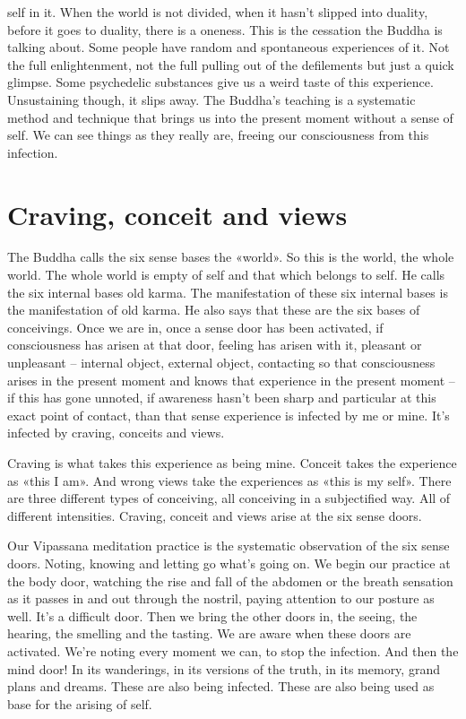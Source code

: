 \documentclass[letterpaper,10pt,english]{sphinxmanual}
\begin{document}
self in it. When the world is not divided, when it hasn’t slipped into duality,
before it goes to duality, there is a oneness.
This is the cessation the Buddha is talking about. Some people have random
and spontaneous experiences of it. Not the full enlightenment, not the full
pulling out of the defilements but just a quick glimpse. Some psychedelic
substances give us a weird taste of this experience. Unsustaining though, it
slips away. The Buddha’s teaching is a systematic method and technique that
brings us into the present moment without a sense of self. We can see things
as they really are, freeing our consciousness from this infection.


\section{Craving, conceit and views}
\label{\detokenize{5-b:craving-conceit-and-views}}
\sphinxAtStartPar
The Buddha calls the six sense bases the «world». So this is the world,
the whole world. The whole world is empty of self and that which belongs
to self. He calls the six internal bases old karma. The manifestation of these
six internal bases is the manifestation of old karma. He also says that these
are the six bases of conceivings. Once we are in, once a sense door has been
activated, if consciousness has arisen at that door, feeling has arisen with it,
pleasant or unpleasant – internal object, external object, contacting so that
consciousness arises in the present moment and knows that experience in the
present moment – if this has gone unnoted, if awareness hasn’t been sharp
and  particular  at  this  exact  point  of  contact,  than  that  sense  experience  is
infected by me or mine. It’s infected by craving, conceits and views.

\sphinxAtStartPar
Craving is what takes this experience as being mine. Conceit takes the
experience as «this I am». And wrong views take the experiences as «this
is my self». There are three different types of conceiving, all conceiving in
a  subjectified  way. All  of  different  intensities.  Craving,  conceit  and  views
arise at the six sense doors.

\sphinxAtStartPar
{}  Our Vipassana meditation practice is the systematic observation of the
six sense doors. Noting, knowing and letting go what’s going on. We begin
our practice at the body door, watching the rise and fall of the abdomen or
the breath sensation as it passes in and out through the nostril, paying attention to our posture as well. It’s a difficult door. Then we bring the other doors
in, the seeing, the hearing, the smelling and the tasting. We are aware when
these doors are activated. We’re noting every moment we can, to stop the
infection. And then the mind door! In its wanderings, in its versions of the
truth, in its memory, grand plans and dreams. These are also being infected.
These are also being used as base for the arising of self.
\end{document}
